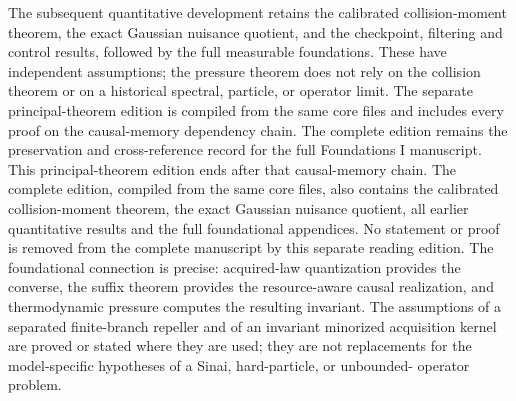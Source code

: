 \ifcomplete
The subsequent quantitative development retains the calibrated
collision-moment theorem, the exact Gaussian nuisance quotient,
and the checkpoint, filtering and control results, followed by the
full measurable foundations. These have independent assumptions;
the pressure theorem does not rely on the collision theorem or on
a historical spectral, particle, or operator limit. The separate
principal-theorem edition is compiled from the same core files and
includes every proof on the causal-memory dependency chain. The
complete edition remains the preservation and cross-reference
record for the full Foundations I manuscript.
\else
This principal-theorem edition ends after that causal-memory
chain. The complete edition, compiled from the same core files,
also contains the calibrated collision-moment theorem, the exact
Gaussian nuisance quotient, all earlier quantitative results and
the full foundational appendices. No statement or proof is removed
from the complete manuscript by this separate reading edition.
\fi
The foundational connection is precise: acquired-law quantization
provides the converse, the suffix theorem provides the resource-aware
causal realization, and thermodynamic pressure computes the resulting
invariant. The assumptions of a separated finite-branch repeller
and of an invariant minorized acquisition kernel are proved or
stated where they are used; they are not replacements for the
model-specific hypotheses of a Sinai, hard-particle, or unbounded-
operator problem.
